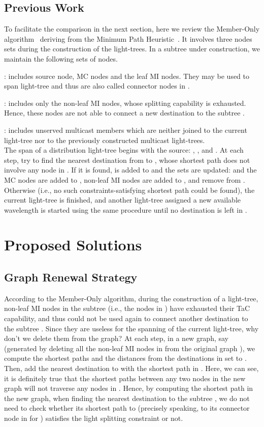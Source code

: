 \documentclass[conference]{IEEEtran}
\begin{document}
\subsection{Previous Work}
\label{subsec: Previous Work}
To facilitate the comparison in the next section, here we review the Member-Only algorithm~\cite{xjzhang2000} deriving from the Minimum Path Heuristic~\cite{hTakahashi1980}. It involves three nodes sets during the construction of the light-trees. In a subtree  under construction, we maintain the following sets of nodes.

   : includes source node, MC nodes and the leaf MI nodes. They may be used to span light-tree  and thus are also called connector nodes in .

   : includes only the non-leaf MI nodes, whose splitting capability is exhausted. Hence, these nodes are not able to connect a new destination to the subtree .

   : includes unserved multicast members which are neither joined to the current light-tree  nor to the previously constructed multicast light-trees.\\

The span of a distribution light-tree  begins with the source: , ,  and . At each step, try to find the nearest destination from  to , whose shortest path  does not involve any node in . If it is found,  is added to  and the sets are updated:  and the MC nodes are added to , non-leaf MI nodes are added to , and remove  from . Otherwise (i.e., no such constraints-satisfying shortest path could be found), the current light-tree  is finished, and another light-tree assigned a new available wavelength is started using the same procedure until no destination is left in .

\section{Proposed Solutions}
\label{sec: Proposed Solutions}
\subsection{Graph Renewal Strategy}
\label{subsec: Graph Renewal Strategy}
According to the Member-Only algorithm, during the construction of a light-tree, non-leaf MI nodes in the subtree  (i.e., the nodes in ) have exhausted their TaC capability, and thus could not be used again to connect another destination to the subtree . Since they are useless for the spanning of the current light-tree, why don't we delete them from the graph? At each step, in a new graph, say  (generated by deleting all the non-leaf MI nodes in  from the original graph ), we compute the shortest paths and the distances from the destinations in set  to . Then, add the nearest destination to  with the shortest path in . Here, we can see, it is definitely true that the shortest paths between any two nodes in the new graph  will not traverse any nodes in . Hence, by computing the shortest path in the new graph, when finding the nearest destination to the subtree , we do not need to check whether its shortest path to  (precisely speaking, to its connector node in  for ) satisfies the light splitting constraint or not.
\end{document}
